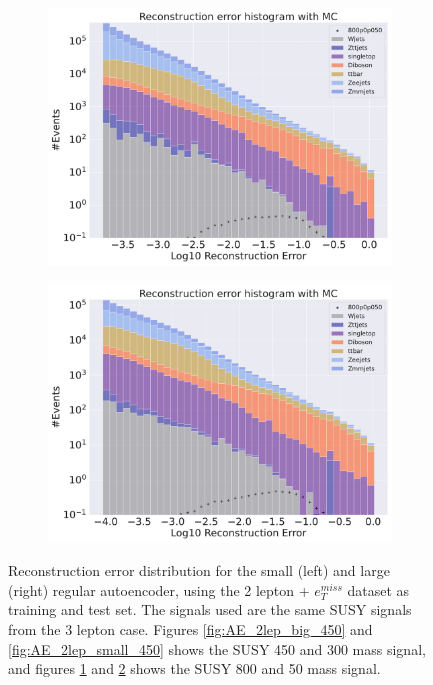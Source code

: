 \begin{figure}[H]
\begin{subfigure}{.45\textwidth}
        \includegraphics[width=\textwidth]{Figures/AE_testing/big/2lep/b_data_recon_big_rm3_feats_sig_800p0p050_.pdf}
        \caption{}
        \label{fig:AE_2lep_big_800}
    \end{subfigure}
    \hfill   
    \begin{subfigure}{.45\textwidth}
        \includegraphics[width=\textwidth]{Figures/AE_testing/small/2lep/b_data_recon_big_rm3_feats_sig_800p0p050_.pdf}
        \caption{}
        \label{fig:AE_2lep_small_800}
    \end{subfigure}
    \hfill      
    \caption[2lep reconstruction error with SUSY signals]{Reconstruction error distribution for the small (left) and large (right)
    regular autoencoder, using the 2 lepton + $e_T^{miss}$ dataset as training and test set. The signals used are the same SUSY signals 
    from the 3 lepton case. Figures \ref{fig:AE_2lep_big_450} and \ref{fig:AE_2lep_small_450} shows the SUSY 450 and 300 mass signal, 
    and figures \ref{fig:AE_2lep_big_800} and \ref{fig:AE_2lep_small_800} shows the SUSY 800 and 50 mass signal.}
    \label{fig:AE_2lep_recon_err_both_sig}
\end{figure}

